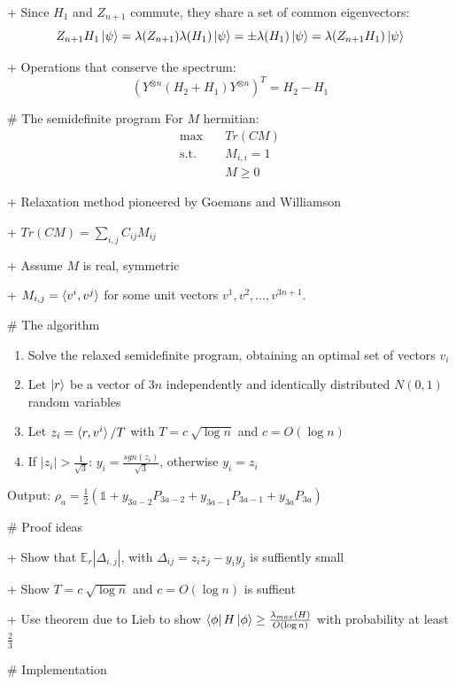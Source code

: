 + Since $H_1$ and $Z_{n+1}$ commute, they share a set of common eigenvectors:
$$Z_{n+1}H_1\ket{\psi} = \lambda(Z_{n+1})\lambda(H_1)\ket{\psi}=\pm \lambda(H_1)\ket{\psi} = \lambda(Z_{n+1}H_1)\ket{\psi}$$

+ Operations that conserve the spectrum: $$\left( Y^{\otimes n}\left( H_2+H_1 \right) Y^{\otimes n} \right) ^{T} = H_2-H_1$$



# The semidefinite program
For  $M$ hermitian:
\begin{align*}
	\text{max} &\quad Tr\left( CM \right)\\
	\text{s.t.} &\quad M_{i,i} = 1\\
	            &\quad M \ge 0
\end{align*}

+ Relaxation method pioneered by Goemans and Williamson

+ $Tr(CM)=\sum_{i,j}C_{ij}M_{ij}$

+ Assume $M$ is real, symmetric

+ $M_{i,j}=\braket{v^i,v^j}$ for some unit vectors $v^1, v^2,\ldots, v^{3n+1}$.

# The algorithm

\begin{enumerate}
	\item Solve the relaxed semidefinite program, obtaining an optimal set of vectors $v_i$
	\item Let $\ket{r}$ be a vector of $3n$ independently and identically distributed $N(0,1)$ random variables
	\item Let $z_i=\braket{r, v^i}/T$ with $T=c~\sqrt{\log{}n}$ and $c=O(\log{}n)$
	\item If $|z_i|>\frac{1}{\sqrt{3}}$: $y_i=\frac{sgn(z_i)}{\sqrt{3}}$, otherwise $y_i=z_i$
\end{enumerate}

Output: $\rho_a=\frac{1}{2}\left(\mathds{1} +y_{3a-2}P_{3a-2}+y_{3a-1}P_{3a-1}+y_{3a}P_{3a}\right)$


# Proof ideas

+ Show that $\mathbb{E}_r\left| \Delta_{i,j} \right|$, with $\Delta_{ij}=z_iz_j-y_iy_j$ is suffiently small

+ Show $T=c~\sqrt{\log{}n}$ and $c=O(\log{}n)$ is suffient

+ Use theorem due to Lieb to show $\bra{\phi}H\ket{\phi}\ge \frac{\lambda_{max}(H)}{O(\log{}n)}$ with probability at least $\frac{2}{3}$


# Implementation

